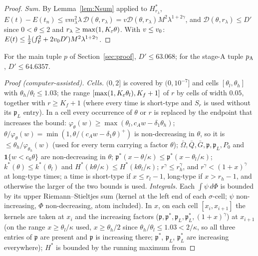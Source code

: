 \begin{proof}
\emph{Sum.} By Lemma~\ref{lem:Nsum} applied to $H_{r_\lambda}^*$, $E(t)-E(t_n)\le vm_\lambda^2\lambda\,\mathcal D(\theta,r_\lambda)
=v\mathcal D(\theta,r_\lambda)M^2\lambda^{1+2\gamma}$, and $\mathcal D(\theta,r_\lambda)\le D'$ since $0<\theta\le2$ and
$r_\lambda\ge\max(1,K_\varepsilon\theta)$. With $v\le v_0$: $E(t)\le\frac12(f_{\mathrm F}^2+2v_0 D')M^2\lambda^{1+2\gamma}$.
\end{proof}

\begin{lemma}[evaluation]\label{lem:Ne}
For the main tuple $p$ of Section~\ref{sec:proof}, $D'\le63.068$; for the stage-A tuple $p_{\mathrm A}$, $D'\le64.6357$.
\end{lemma}

\begin{proof}[Proof \textup(computer-assisted\textup)]
\emph{Cells.} $(0,2]$ is covered by $(0,10^{-7}]$ and cells $[\theta_l,\theta_h]$ with $\theta_h/\theta_l\le1.03$; the range
$[\max(1,K_\varepsilon\theta_l),K_f+1]$ of $r$ by cells of width $0.05$, together with $r\ge K_f+1$ (where every time is short-type and $S_r$ is used
without its $\mathfrak p_L$ entry). In a cell every occurrence of $\theta$ or $r$ is replaced by the endpoint that increases the bound:
$\varphi_\theta(w)\ge\max(\theta_l,c_Aw-\delta_1\theta_h)$; $\theta/\varphi_\theta(w)=\min(1,\theta/(c_Aw-\delta_1\theta)^+)$ is non-decreasing in
$\theta$, so it is $\le\theta_h/\varphi_{\theta_h}(w)$ (used for every term carrying a factor $\theta$); $\bar\Omega,\bar Q,\bar G,\mathfrak p,\mathfrak p_L,P_0$
and $\mathbf 1\{w<c_6\theta\}$ are non-decreasing in $\theta$; $\mathfrak p^*(x-\theta/\kappa)\le\mathfrak p^*(x-\theta_l/\kappa)$; $k^*(\theta)\le k^*(\theta_l)$
and $H^*(k\theta/\kappa)\le H^*(k\theta_l/\kappa)$; $r^\gamma\le r_h^\gamma$, and $r^\gamma<(1+x)^\gamma$ at long-type times; a time is
short-type if $x\le r_l-1$, long-type if $x>r_h-1$, and otherwise the larger of the two bounds is used.
\emph{Integrals.} Each $\int\psi\,d\Phi$ is bounded by its upper Riemann--Stieltjes sum (kernel at the left end of each $\sigma$-cell; $\psi$
non-increasing, $\Phi$ non-decreasing, atom included). In $x$, on each cell $[x_i,x_{i+1}]$ the kernels are taken at $x_i$ and the
increasing factors ($\mathfrak p,\mathfrak p^*,\mathfrak p_L,\mathfrak p_L^*,(1+x)^\gamma$) at $x_{i+1}$ (on the range $x\ge\theta_l/\kappa$ used, $x\ge\theta_h/2$ since $\theta_h/\theta_l\le1.03<2/\kappa$, so all three entries of $\mathfrak p$ are present and $\mathfrak p$ is increasing there; $\mathfrak p^*$, $\mathfrak p_L$, $\mathfrak p_L^*$ are increasing everywhere); $H^*$ is bounded by the running maximum from

\end{proof}
